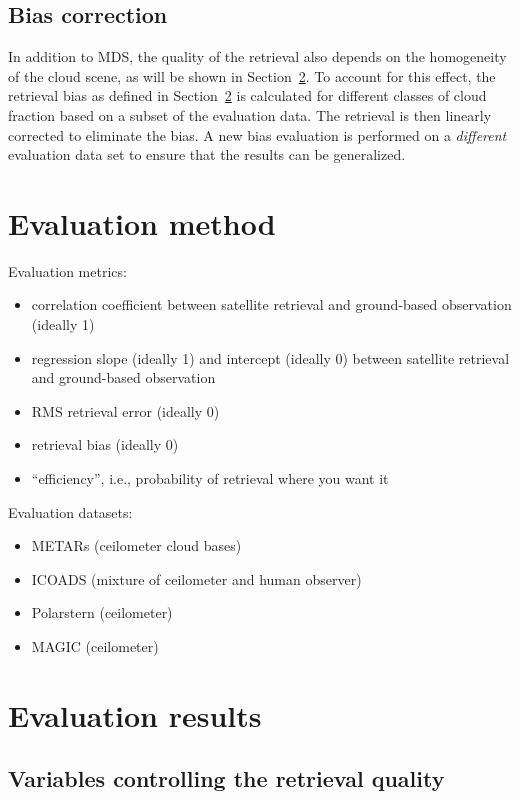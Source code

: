 \documentclass{article}
\begin{document}
\subsection{Bias correction}
In addition to MDS, the quality of the retrieval also depends on the homogeneity
of the cloud scene, as will be shown in Section~\ref{sec:eval-results}.  To
account for this effect, the retrieval bias as defined in
Section~\ref{sec:eval-results} is calculated for different classes of cloud
fraction based on a subset of the evaluation data.  The retrieval is then
linearly corrected to eliminate the bias.  A new bias evaluation is performed on
a \emph{different} evaluation data set to ensure that the results can be
generalized. 

\section{Evaluation method}
\label{sec:eval}
\par Evaluation metrics:
\begin{itemize}
\item correlation coefficient between satellite retrieval and ground-based
  observation (ideally 1)
\item regression slope (ideally 1) and intercept (ideally 0) between satellite
  retrieval and ground-based observation
\item RMS retrieval error (ideally 0)
\item retrieval bias (ideally 0)
\item ``efficiency'', i.e., probability of retrieval where you want it
\end{itemize}

\par Evaluation datasets:
\begin{itemize}
\item METARs (ceilometer cloud bases)
\item ICOADS (mixture of ceilometer and human observer)
\item Polarstern (ceilometer)
\item MAGIC (ceilometer)
\end{itemize}

\section{Evaluation results}
\label{sec:eval-results}

\subsection{Variables controlling the retrieval quality}
\end{document}
